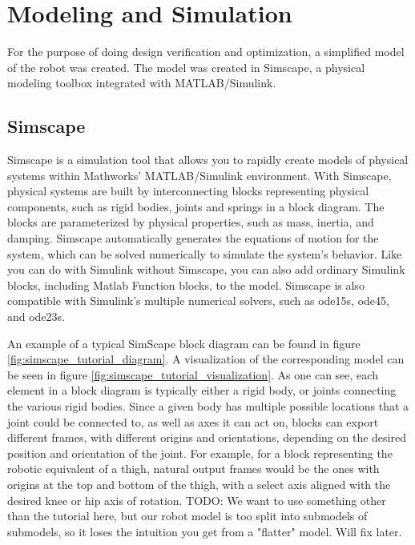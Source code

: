 \section{Modeling and Simulation}
\label{sec:modeling_and_simulation}
For the purpose of doing design verification and optimization, a simplified model of the robot was created. The model was created in Simscape, a physical modeling toolbox integrated with MATLAB/Simulink. 

\subsection{Simscape}

Simscape is a simulation tool that allows you to rapidly create models of physical systems within Mathworks' MATLAB/Simulink environment. With Simscape, physical systems are built by interconnecting blocks representing physical components, such as rigid bodies, joints and springs in a block diagram. The blocks are parameterized by physical properties, such as mass, inertia, and damping. Simscape automatically generates the equations of motion for the system, which can be solved numerically to simulate the system's behavior. Like you can do with Simulink without Simscape, you can also add ordinary Simulink blocks, including Matlab Function blocks, to the model. Simscape is also compatible with Simulink's multiple numerical solvers, such as ode15s, ode45, and ode23s. 

An example of a typical SimScape block diagram can be found in figure \ref{fig:simscape_tutorial_diagram}. A visualization of the corresponding model can be seen in figure \ref{fig:simscape_tutorial_visualization}. As one can see, each element in a block diagram is typically either a rigid body, or joints connecting the various rigid bodies. Since a given body has multiple possible locations that a joint could be connected to, as well as axes it can act on, blocks can export different frames, with different origins and orientations, depending on the desired position and orientation of the joint. For example, for a block representing the robotic equivalent of a thigh, natural output frames would be the ones with origins at the top and bottom of the thigh, with a select axis aligned with the desired knee or hip axis of rotation. TODO: We want to use something other than the tutorial here, but our robot model is too split into submodels of submodels, so it loses the intuition you get from a "flatter" model. Will fix later. 

